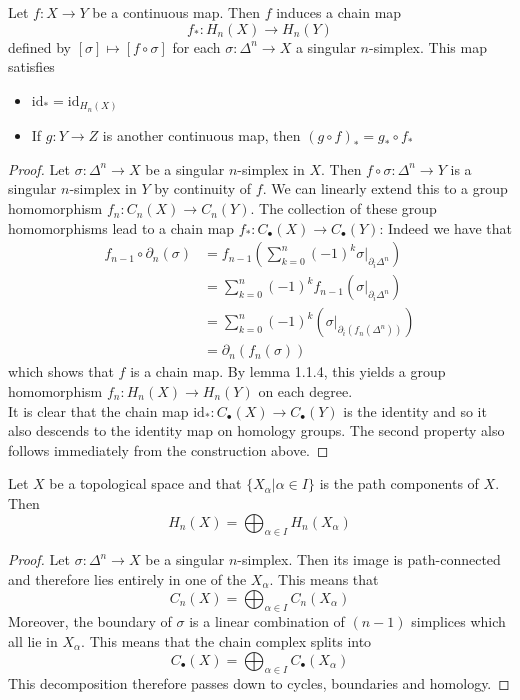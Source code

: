 \documentclass[a4paper]{article}
\begin{document}
\begin{prp}{}{} Let $f:X\to Y$ be a continuous map. Then $f$ induces a chain map $$f_\ast:H_n(X)\to H_n(Y)$$ defined by $[\sigma]\mapsto[f\circ\sigma]$ for each $\sigma:\Delta^n\to X$ a singular $n$-simplex. This map satisfies 
\begin{itemize}
\item $\text{id}_\ast=\text{id}_{H_n(X)}$
\item If $g:Y\to Z$ is another continuous map, then $(g\circ f)_\ast=g_\ast\circ f_\ast$
\end{itemize} 
\begin{proof}
Let $\sigma:\Delta^n\to X$ be a singular $n$-simplex in $X$. Then $f\circ\sigma:\Delta^n\to Y$ is a singular $n$-simplex in $Y$ by continuity of $f$. We can linearly extend this to a group homomorphism $f_n:C_n(X)\to C_n(Y)$. The collection of these group homomorphisms lead to a chain map $f_\ast:C_\bullet(X)\to C_\bullet(Y)$: Indeed we have that 
\begin{align*}
f_{n-1}\circ\partial_n(\sigma)&=f_{n-1}\left(\sum_{k=0}^n(-1)^k\sigma|_{\partial_i\Delta^n}\right)\\
&=\sum_{k=0}^n(-1)^kf_{n-1}\left(\sigma|_{\partial_i\Delta^n}\right)\\
&=\sum_{k=0}^n(-1)^k\left(\sigma|_{\partial_i(f_n(\Delta^n))}\right)\\
&=\partial_n(f_n(\sigma))
\end{align*}
which shows that $f$ is a chain map. By lemma 1.1.4, this yields a group homomorphism $f_n:H_n(X)\to H_n(Y)$ on each degree. \\

It is clear that the chain map $\text{id}_\ast:C_\bullet(X)\to C_\bullet(Y)$ is the identity and so it also descends to the identity map on homology groups. The second property also follows immediately from the construction above. 
\end{proof}
\end{prp}

\begin{prp}{}{} Let $X$ be a topological space and that $\{X_\alpha|\alpha\in I\}$ is the path components of $X$. Then $$H_n(X)=\bigoplus_{\alpha\in I} H_n(X_\alpha)$$ 
\begin{proof}
Let $\sigma:\Delta^n\to X$ be a singular $n$-simplex. Then its image is path-connected and therefore lies entirely in one of the $X_\alpha$. This means that $$C_n(X)=\bigoplus_{\alpha\in I}C_n(X_\alpha)$$ Moreover, the boundary of $\sigma$ is a linear combination of $(n-1)$ simplices which all lie in $X_\alpha$. This means that the chain complex splits into $$C_\bullet(X)=\bigoplus_{\alpha\in I}C_\bullet(X_\alpha)$$ This decomposition therefore passes down to cycles, boundaries and homology. 
\end{proof}
\end{prp}
\end{document}
